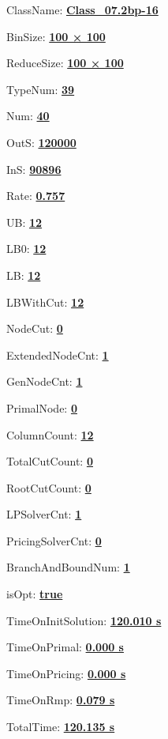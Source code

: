 \documentclass[11pt]{article}
\begin{document}
\pagestyle{empty}


ClassName: \underline{\textbf{Class_07.2bp-16}}
\par
BinSize: \underline{\textbf{100 × 100}}
\par
ReduceSize: \underline{\textbf{100 × 100}}
\par
TypeNum: \underline{\textbf{39}}
\par
Num: \underline{\textbf{40}}
\par
OutS: \underline{\textbf{120000}}
\par
InS: \underline{\textbf{90896}}
\par
Rate: \underline{\textbf{0.757}}
\par
UB: \underline{\textbf{12}}
\par
LB0: \underline{\textbf{12}}
\par
LB: \underline{\textbf{12}}
\par
LBWithCut: \underline{\textbf{12}}
\par
NodeCut: \underline{\textbf{0}}
\par
ExtendedNodeCnt: \underline{\textbf{1}}
\par
GenNodeCnt: \underline{\textbf{1}}
\par
PrimalNode: \underline{\textbf{0}}
\par
ColumnCount: \underline{\textbf{12}}
\par
TotalCutCount: \underline{\textbf{0}}
\par
RootCutCount: \underline{\textbf{0}}
\par
LPSolverCnt: \underline{\textbf{1}}
\par
PricingSolverCnt: \underline{\textbf{0}}
\par
BranchAndBoundNum: \underline{\textbf{1}}
\par
isOpt: \underline{\textbf{true}}
\par
TimeOnInitSolution: \underline{\textbf{120.010 s}}
\par
TimeOnPrimal: \underline{\textbf{0.000 s}}
\par
TimeOnPricing: \underline{\textbf{0.000 s}}
\par
TimeOnRmp: \underline{\textbf{0.079 s}}
\par
TotalTime: \underline{\textbf{120.135 s}}
\par
\newpage


\end{document}

